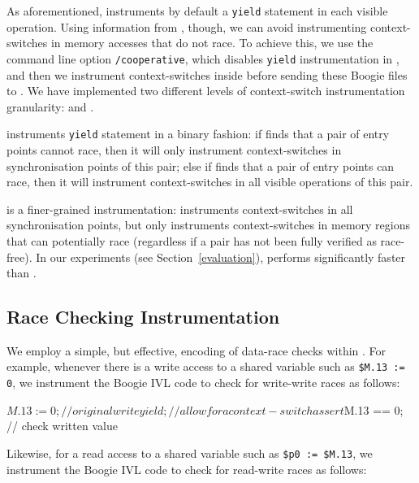 As aforementioned, \corral instruments by default a \texttt{yield} statement in
each visible operation. Using information from \whoop, though, we can avoid
instrumenting context-switches in memory accesses that do not race. To achieve
this, we use the \corral command line option \texttt{/cooperative}, which
disables \texttt{yield} instrumentation in \corral, and then we instrument
context-switches inside \whoop before sending these Boogie files to \corral. We
have implemented two different levels of context-switch instrumentation
granularity: \emph{\yieldcoarse} and \emph{\yieldmr}.

\yieldcoarse instruments \texttt{yield} statement in a binary fashion: if \whoop
finds that a pair of entry points cannot race, then it will only instrument
context-switches in synchronisation points of this pair; else if \whoop finds
that a pair of entry points can race, then it will instrument context-switches
in all visible operations of this pair.

\yieldmr is a finer-grained instrumentation: \whoop instruments context-switches
in all synchronisation points, but only instruments context-switches in memory
regions that can potentially race (regardless if a pair has not been fully
verified as race-free). In our experiments (see Section~\ref{evaluation}),
\yieldmr performs significantly faster than \yieldcoarse.

\subsection{Race Checking Instrumentation}
\label{bf:racechecking}

We employ a simple, but effective, encoding of data-race checks within \corral.
For example, whenever there is a write access to a shared variable such as
\texttt{\$M.13 := 0}, we instrument the Boogie IVL code to check for write-write
races as follows:
%
\begin{boogie}
$M.13 := 0;        // original write
yield;             // allow for a context-switch
assert $M.13 == 0; // check written value
\end{boogie}
%
Likewise, for a read access to a shared variable such as \texttt{\$p0 :=
\$M.13}, we instrument the Boogie IVL code to check for read-write races as
follows:
%

